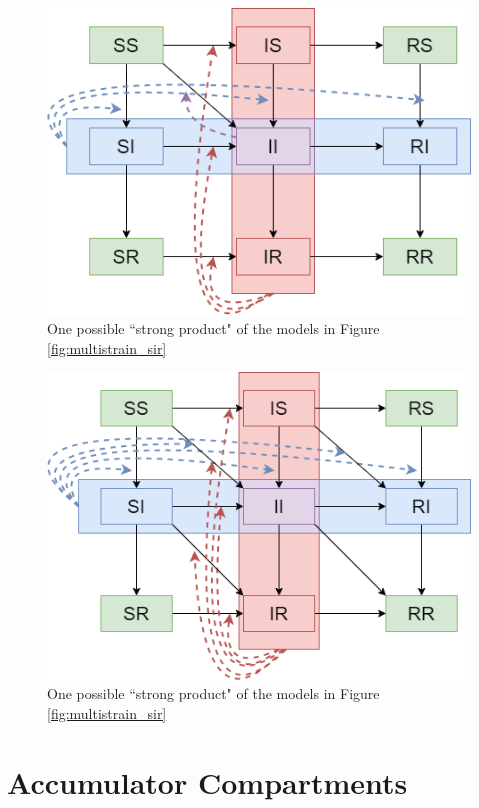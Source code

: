 \begin{appendices}
\begin{figure}
    \centering
    \includegraphics[width=\textwidth]{images/strong_product_type_2.png}
    \caption{One possible “strong product" of the models in Figure \ref{fig:multistrain_sir}}
    \label{fig:strong_product_2}
\end{figure}

\begin{figure}
    \centering
    \includegraphics[width=\textwidth]{images/strong_product_type_3.png}
    \caption{One possible “strong product" of the models in Figure \ref{fig:multistrain_sir}}
    \label{fig:strong_product_3}
\end{figure}

\FloatBarrier

\section{Accumulator Compartments}\label{secB1}


\end{appendices}

